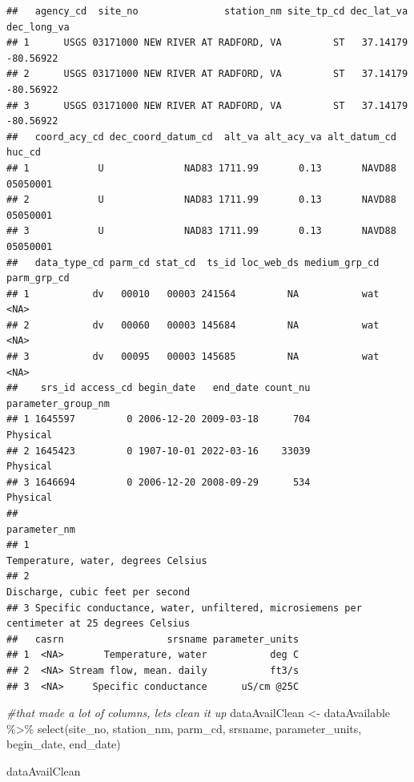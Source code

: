\documentclass[
]{book}
\newenvironment{Shaded}{\begin{snugshade}}{\end{snugshade}}
\newcommand{\CommentTok}[1]{\textcolor[rgb]{0.56,0.35,0.01}{\textit{#1}}}
\newcommand{\FunctionTok}[1]{\textcolor[rgb]{0.00,0.00,0.00}{#1}}
\newcommand{\NormalTok}[1]{#1}
\newcommand{\OtherTok}[1]{\textcolor[rgb]{0.56,0.35,0.01}{#1}}
\newcommand{\SpecialCharTok}[1]{\textcolor[rgb]{0.00,0.00,0.00}{#1}}
\begin{document}
\begin{verbatim}
##   agency_cd  site_no               station_nm site_tp_cd dec_lat_va dec_long_va
## 1      USGS 03171000 NEW RIVER AT RADFORD, VA         ST   37.14179   -80.56922
## 2      USGS 03171000 NEW RIVER AT RADFORD, VA         ST   37.14179   -80.56922
## 3      USGS 03171000 NEW RIVER AT RADFORD, VA         ST   37.14179   -80.56922
##   coord_acy_cd dec_coord_datum_cd  alt_va alt_acy_va alt_datum_cd   huc_cd
## 1            U              NAD83 1711.99       0.13       NAVD88 05050001
## 2            U              NAD83 1711.99       0.13       NAVD88 05050001
## 3            U              NAD83 1711.99       0.13       NAVD88 05050001
##   data_type_cd parm_cd stat_cd  ts_id loc_web_ds medium_grp_cd parm_grp_cd
## 1           dv   00010   00003 241564         NA           wat        <NA>
## 2           dv   00060   00003 145684         NA           wat        <NA>
## 3           dv   00095   00003 145685         NA           wat        <NA>
##    srs_id access_cd begin_date   end_date count_nu parameter_group_nm
## 1 1645597         0 2006-12-20 2009-03-18      704           Physical
## 2 1645423         0 1907-10-01 2022-03-16    33039           Physical
## 3 1646694         0 2006-12-20 2008-09-29      534           Physical
##                                                                                 parameter_nm
## 1                                                        Temperature, water, degrees Celsius
## 2                                                           Discharge, cubic feet per second
## 3 Specific conductance, water, unfiltered, microsiemens per centimeter at 25 degrees Celsius
##   casrn                  srsname parameter_units
## 1  <NA>       Temperature, water           deg C
## 2  <NA> Stream flow, mean. daily           ft3/s
## 3  <NA>     Specific conductance      uS/cm @25C
\end{verbatim}

\begin{Shaded}
\begin{Highlighting}[]
\CommentTok{\#that made a lot of columns, let\textquotesingle{}s clean it up}
\NormalTok{dataAvailClean }\OtherTok{\textless{}{-}}\NormalTok{ dataAvailable }\SpecialCharTok{\%\textgreater{}\%} \FunctionTok{select}\NormalTok{(site\_no, }
\NormalTok{                                           station\_nm,}
\NormalTok{                                           parm\_cd, }
\NormalTok{                                           srsname, }
\NormalTok{                                           parameter\_units,}
\NormalTok{                                           begin\_date, }
\NormalTok{                                           end\_date)}

\NormalTok{dataAvailClean}
\end{Highlighting}
\end{Shaded}
\end{document}
